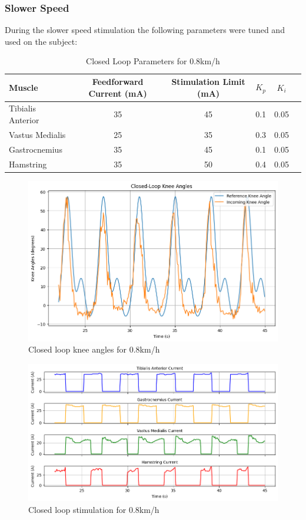 \subsubsection{Slower Speed}
During the slower speed stimulation the following parameters were tuned and used on the subject:

\begin{table}[h!]
\centering
\caption{Closed Loop Parameters for 0.8km/h}
\begin{tabular}{|l|c|c|c|c|c|}
\hline
\textbf{Muscle} & \textbf{Feedforward Current (mA)} & \textbf{Stimulation Limit (mA)} & \textbf{$K_p$} & \textbf{$K_i$} \\ \hline
Tibialis Anterior  & 35 & 45 & 0.1 & 0.05 \\ \hline
Vastus Medialis    & 25 & 35 & 0.3 & 0.05 \\ \hline
Gastrocnemius      & 35 & 45 & 0.1 & 0.05 \\ \hline
Hamstring          & 35 & 50 & 0.4 & 0.05 \\ \hline
\end{tabular}
\label{tab:closed_loop_9}
\end{table}

\begin{figure} [H]
    \centering
    \includegraphics[width=0.95\linewidth]{images/CL9refpng.png}
    \caption{Closed loop knee angles for 0.8km/h}
    \label{fig:cl9ref}
\end{figure}

\begin{figure} [H]
    \centering
    \includegraphics[width=0.9\linewidth]{images/CL9stimpng.png}
    \caption{Closed loop stimulation for 0.8km/h}
    \label{fig:cl9stim}
\end{figure}

